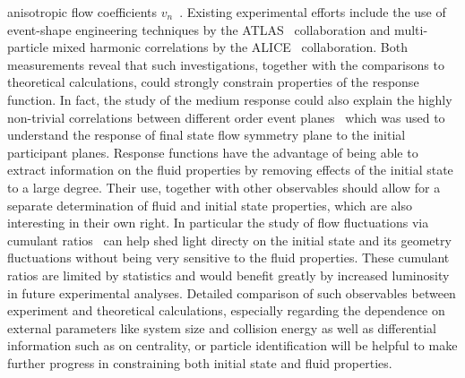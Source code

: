   anisotropic flow coefficients $v_n$~\cite{HION-2012-03,HION-2014-03}. 
Existing experimental efforts include the use of event-shape engineering techniques by the 
  ATLAS~\cite{HION-2014-03} collaboration and multi-particle 
  mixed harmonic correlations by the ALICE~\cite{ALICE:2016kpq} collaboration. 
Both measurements reveal that such investigations, 
   together with the comparisons to theoretical calculations, could strongly
  constrain properties of the response function. 
In fact, the study of the medium response could also explain the highly non-trivial 
  correlations between different order event planes~\cite{HION-2012-03}
  which was used to understand the response of final state flow symmetry
  plane to the initial participant planes.
Response functions have the advantage of being able to extract information 
  on the fluid properties by removing effects of the initial state to 
  a large degree. 
Their use, together with other observables should allow for a separate 
  determination of fluid and initial state properties, which are also 
  interesting in their own right.
In particular the study of flow fluctuations via cumulant ratios~\cite{Giacalone:2017uqx} 
  can help shed light directy on the initial state and its geometry 
  fluctuations without being very sensitive to the fluid properties.
These cumulant ratios are limited by statistics and would benefit greatly 
  by increased luminosity in future experimental analyses.
Detailed comparison of such observables between experiment and theoretical 
  calculations, especially regarding the dependence on external parameters 
  like system size and collision energy as well as differential information 
  such as on centrality, or particle identification will be helpful to make 
  further progress in constraining both initial state and fluid properties.



